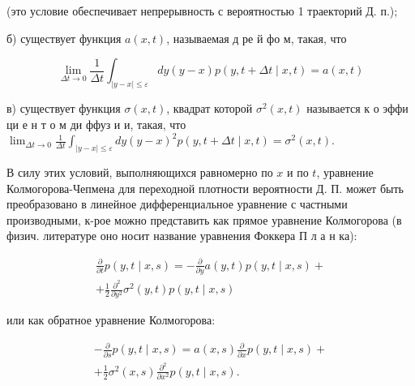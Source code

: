 \documentclass[10pt]{article}
\begin{document}
(это условие обеспечивает непрерывность с вероятностью 1 траекторий Д. п.);



б) существует функция $a(x, t)$, называемая д ре й фо м, такая, что



\[

\lim _{\Delta t \rightarrow 0} \frac{1}{\Delta t} \int_{|y-x| \leqslant \varepsilon} d y(y-x) p(y, t+\Delta t \mid x, t)=a(x, t)

\]



в) существует функция $\sigma(x, t)$, квадрат которой $\sigma^{2}(x, t)$ называется к о эффи ци е н т о м ди ффуз и и, такая, что $\lim _{\Delta t \rightarrow 0} \frac{1}{\Delta t} \int_{|y-x| \leqslant \varepsilon} d y(y-x)^{2} p(y, t+\Delta t \mid x, t)=\sigma^{2}(x, t)$.



В силу этих условий, выполняющихся равномерно по $x$ и по $t$, уравнение Колмогорова-Чепмена для переходной плотности вероятности Д. П. может быть преобразовано в линейное дифференциальное уравнение с частными производными, к-рое можно представить как прямое уравнение Колмогорова (в физич. литературе оно носит название уравнения Фоккера П л а н ка):



\[

\begin{gathered}

\frac{\partial}{\partial t} p(y, t \mid x, s)=-\frac{\partial}{\partial y} a(y, t) p(y, t \mid x, s)+ \\

+\frac{1}{2} \frac{\partial^{2}}{\partial y^{2}} \sigma^{2}(y, t) p(y, t \mid x, s)

\end{gathered}

\]



или как обратное уравнение Колмогорова:



\[

\begin{gathered}

-\frac{\partial}{\partial s} p(y, t \mid x, s)=a(x, s) \frac{\partial}{\partial x} p(y, t \mid x, s)+ \\

+\frac{1}{2} \sigma^{2}(x, s) \frac{\partial^{2}}{\partial x^{2}} p(y, t \mid x, s) .

\end{gathered}

\]
\end{document}
